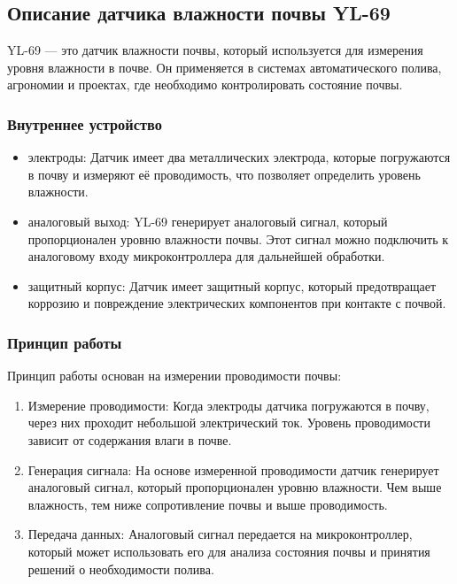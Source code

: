 \documentclass{bmstu}
\begin{document}
    \subsection{Описание датчика влажности почвы YL-69}
    YL-69\cite{GuideSoilMoisture2016} — это датчик влажности почвы, который используется для измерения уровня влажности в почве. Он применяется в системах автоматического полива, агрономии и проектах, где необходимо контролировать состояние почвы.

    \subsubsection{Внутреннее устройство}
    \begin{itemize}
        \item электроды: Датчик имеет два металлических электрода, которые погружаются в почву и измеряют её проводимость, что позволяет определить уровень влажности.
        \item аналоговый выход: YL-69 генерирует аналоговый сигнал, который пропорционален уровню влажности почвы. Этот сигнал можно подключить к аналоговому входу микроконтроллера для дальнейшей обработки.
        \item защитный корпус: Датчик имеет защитный корпус, который предотвращает коррозию и повреждение электрических компонентов при контакте с почвой.
    \end{itemize}

    \subsubsection{Принцип работы}
    Принцип работы основан на измерении проводимости почвы:
    \begin{enumerate}
        \item Измерение проводимости: Когда электроды датчика погружаются в почву, через них проходит небольшой электрический ток. Уровень проводимости зависит от содержания влаги в почве.
        \item Генерация сигнала: На основе измеренной проводимости датчик генерирует аналоговый сигнал, который пропорционален уровню влажности. Чем выше влажность, тем ниже сопротивление почвы и выше проводимость.
        \item Передача данных: Аналоговый сигнал передается на микроконтроллер, который может использовать его для анализа состояния почвы и принятия решений о необходимости полива.
    \end{enumerate}
\end{document}

